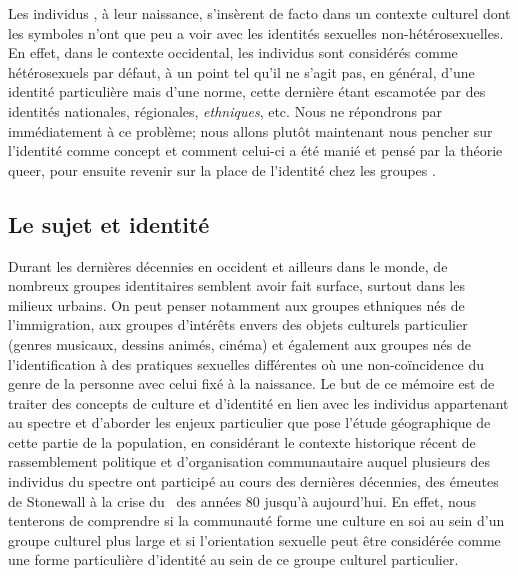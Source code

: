Les individus \lgbt{}, à leur naissance, s'insèrent de facto dans un contexte culturel dont les symboles n'ont que peu a voir avec les identités sexuelles non-hétérosexuelles. 
En effet, dans le contexte occidental, les individus sont considérés comme hétérosexuels par défaut, à un point tel qu'il ne s'agit pas, en général, d'une identité particulière mais d'une norme, cette dernière étant escamotée par des identités nationales, régionales, \emph{ethniques}, etc.
Nous ne répondrons par immédiatement à ce problème; nous allons plutôt maintenant nous pencher sur l'identité comme concept et comment celui-ci a été manié et pensé par la théorie queer, pour ensuite revenir sur la place de l'identité chez les groupes \lgbt{}.

\subsection{Le sujet et identité}
\label{subsec:sujet_et_identité} Durant les dernières décennies en occident et ailleurs dans le monde, de nombreux groupes identitaires semblent avoir fait surface, surtout dans les milieux urbains. 
On peut penser notamment aux groupes ethniques nés de l'immigration, aux groupes d'intérêts envers des objets culturels particulier (genres musicaux, dessins animés, cinéma) et également aux groupes nés de l'identification à des pratiques sexuelles différentes où une non-coïncidence du genre de la personne avec celui fixé à la naissance. 
Le but de ce mémoire est de traiter des concepts de culture et d'identité en lien avec les individus appartenant au spectre \lgbt{} et d'aborder les enjeux particulier que pose l'étude géographique de cette partie de la population, en considérant le contexte historique récent de rassemblement politique et d'organisation communautaire auquel plusieurs des individus du spectre \lgbt{} ont participé au cours des dernières décennies, des émeutes de Stonewall à la crise du \sida\ des années 80 jusqu'à aujourd'hui. 
En effet, nous tenterons de comprendre si la communauté \lgbt{} forme une culture en soi au sein d'un groupe culturel plus large et si l'orientation sexuelle peut être considérée comme une forme particulière d'identité au sein de ce groupe culturel particulier. 

